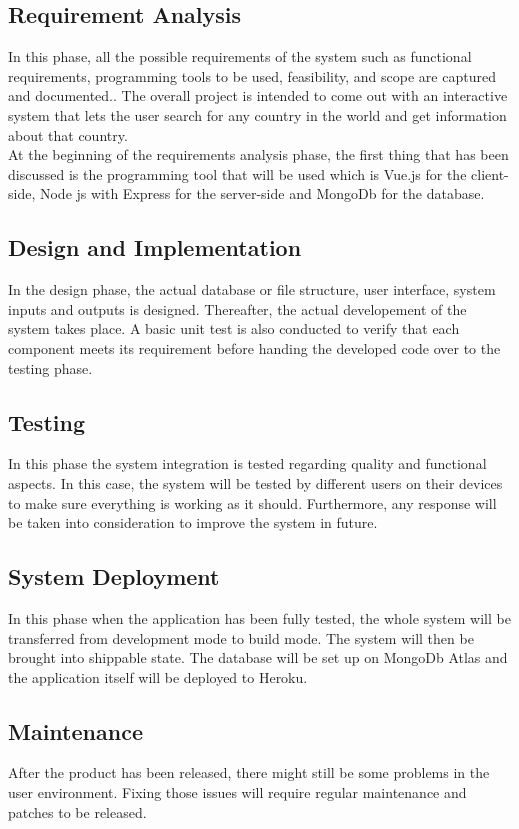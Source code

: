 \documentclass[twoside, a4paper, 12pt]{report}
\begin{document}
\subsection{Requirement Analysis}
In this phase, all the possible requirements of the system such as functional requirements, programming tools to be used, feasibility, and scope are captured and documented.\autocite{petersen2009waterfall}. The overall project is intended to come out with an interactive system that lets the user search for any country in the world and get information about that country.\\
\indent
At the beginning of the requirements analysis phase, the first thing that has been discussed is the programming tool that will be used which is Vue.js for the client-side, Node js with Express for the server-side and MongoDb for the database.

\subsection{Design and Implementation}
In the design phase, the actual database or file structure, user interface, system inputs and outputs is designed. Thereafter, the actual developement of the system takes place. A basic unit test is also conducted to verify that each component meets its requirement before handing the developed code over to the testing phase.

\subsection{Testing}
In this phase the system integration is tested regarding quality and functional aspects. In this case, the system will be tested by different users on their devices to make sure everything is working as it should. Furthermore, any response will be taken into consideration to improve the system in future.

\subsection{System Deployment}
In this phase when the application has been fully tested, the whole system will be transferred from development mode to build mode. The system will then be brought into shippable state. The database will be set up on MongoDb Atlas and the application itself will be deployed to Heroku.

\subsection{Maintenance}
After the product has been released, there might still be some problems in the user environment. Fixing those issues will require regular maintenance and patches to be released.
\end{document}
